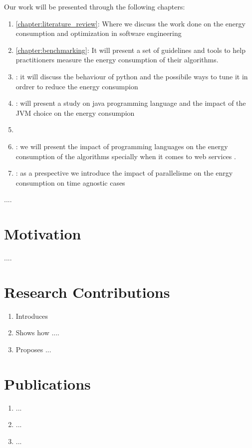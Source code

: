 Our work will be presented through the following chapters:
\begin{enumerate}
    \item \ref{chapter:literature_review}: Where we discuss the work done on the energy consumption and optimization in software engineering
    \item \ref{chapter:benchmarking}: It will present a set of guidelines and tools to help practitioners measure the energy consumption of their algorithms.
    \item : it will discuss the behaviour of python and the possibile ways to tune it in ordrer to reduce the energy consumpion
    \item : will present a study on java programming language and the impact of the JVM choice on the energy consumpion
    \item \item : we will present the impact of programming languages on the energy consumption of the algorithms specially when it comes to web services .
    \item : as a prespective we introduce the impact of parallelisme on the enrgy consumption on time agnostic cases
\end{enumerate}




....


\section{Motivation}
....


\section{Research Contributions}


\begin{enumerate}

    \item Introduces
    \item Shows how ....
    \item Proposes ...

\end{enumerate}



\section{Publications}

\begin{enumerate}
    \item ...

    \item ...

    \item ...

\end{enumerate}
\cleardoublepage
